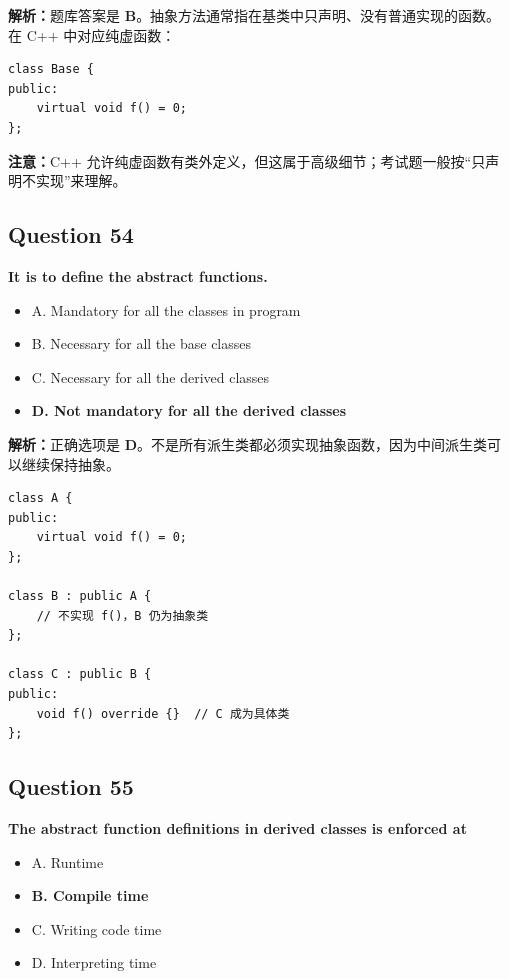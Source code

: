 \documentclass[11pt, a4paper]{article}
\begin{document}
\textbf{解析：}题库答案是 \textbf{B}。抽象方法通常指在基类中只声明、没有普通实现的函数。在 C++ 中对应纯虚函数：
\begin{lstlisting}
class Base {
public:
    virtual void f() = 0;
};
\end{lstlisting}

\textbf{注意：}C++ 允许纯虚函数有类外定义，但这属于高级细节；考试题一般按“只声明不实现”来理解。


\subsection*{Question 54}
\textbf{It is \underline{\hspace{2cm}} to define the abstract functions.}
\begin{itemize}
    \item A. Mandatory for all the classes in program
    \item B. Necessary for all the base classes
    \item C. Necessary for all the derived classes
    \item \textbf{D. Not mandatory for all the derived classes}
\end{itemize}

\textbf{解析：}正确选项是 \textbf{D}。不是所有派生类都必须实现抽象函数，因为中间派生类可以继续保持抽象。
\begin{lstlisting}
class A {
public:
    virtual void f() = 0;
};

class B : public A {
    // 不实现 f()，B 仍为抽象类
};

class C : public B {
public:
    void f() override {}  // C 成为具体类
};
\end{lstlisting}


\subsection*{Question 55}
\textbf{The abstract function definitions in derived classes is enforced at \underline{\hspace{2cm}}}
\begin{itemize}
    \item A. Runtime
    \item \textbf{B. Compile time}
    \item C. Writing code time
    \item D. Interpreting time
\end{itemize}
\end{document}

